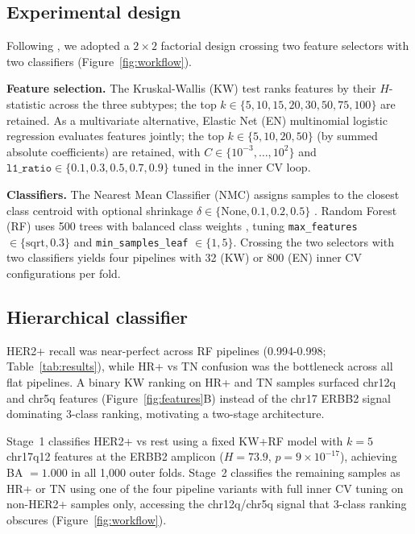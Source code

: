 \documentclass[11pt,a4paper,twocolumn]{article}
\begin{document}
\subsection{Experimental design}
\label{sec:design}

Following \citet{wessels2005protocol}, we adopted a $2 \times 2$ factorial design crossing two feature selectors with two classifiers (Figure~\ref{fig:workflow}).

\textbf{Feature selection.} The Kruskal-Wallis (KW) test \citep{kruskalwallis1952} ranks features by their $H$-statistic across the three subtypes; the top \mbox{$k \in \{5,10,15,20,30,50,75,100\}$} are retained. As a multivariate alternative, Elastic Net (EN) multinomial logistic regression \citep{zou2005elasticnet} evaluates features jointly; the top $k \in \{5,10,20,50\}$ (by summed absolute coefficients) are retained, with $C \in \{10^{-3}, \ldots, 10^{2}\}$ and $\texttt{l1\_ratio} \in \{0.1, 0.3, 0.5, 0.7, 0.9\}$ tuned in the inner CV loop.

\textbf{Classifiers.} The Nearest Mean Classifier (NMC) assigns samples to the closest class centroid with optional shrinkage $\delta \in \{\text{None}, 0.1, 0.2, 0.5\}$ \citep{wessels2005protocol}. Random Forest (RF) uses 500 trees with balanced class weights \citep{breiman2001random}, tuning \texttt{max\_features} $\in \{\text{sqrt}, 0.3\}$ and \texttt{min\_samples\_leaf} $\in \{1, 5\}$. Crossing the two selectors with two classifiers yields four pipelines with 32 (KW) or 800 (EN) inner CV configurations per fold.

\subsection{Hierarchical classifier}
\label{sec:hierarchical}

HER2+ recall was near-perfect across RF pipelines (0.994-0.998; Table~\ref{tab:results}), while HR+ vs TN confusion was the bottleneck across all flat pipelines. A binary KW ranking on HR+ and TN samples surfaced chr12q and chr5q features (Figure~\ref{fig:features}B) instead of the chr17 ERBB2 signal dominating 3-class ranking, motivating a two-stage architecture.

Stage~1 classifies HER2+ vs rest using a fixed KW+RF model with $k = 5$ chr17q12 features at the ERBB2 amplicon ($H = 73.9$, $p = 9 \times 10^{-17}$), achieving BA $= 1.000$ in all 1,000 outer folds. Stage~2 classifies the remaining samples as HR+ or TN using one of the four pipeline variants with full inner CV tuning on non-HER2+ samples only, accessing the chr12q/chr5q signal that 3-class ranking obscures (Figure~\ref{fig:workflow}).
\end{document}
